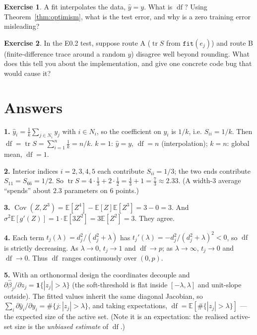 \documentclass[11pt]{article}
\DeclareMathOperator{\tr}{tr}
\DeclareMathOperator{\Cov}{Cov}
\DeclareMathOperator{\df}{df}
\newcommand{\E}{\mathbb{E}}
\newcommand{\yhat}{\hat y}
\theoremstyle{definition}
\newtheorem{exercise}{Exercise}
\theoremstyle{plain}
\begin{document}
\begin{exercise}
A fit interpolates the data, $\yhat=y$. What is $\df$? Using
Theorem~\ref{thm:optimism}, what is the test error, and why is a zero training
error misleading?
\end{exercise}

\begin{exercise}
In the E0.2 test, suppose route A ($\tr S$ from $\texttt{fit}(e_j)$) and route B
(finite-difference trace around a random $y$) disagree well beyond rounding. What
does this tell you about the implementation, and give one concrete code bug that
would cause it?
\end{exercise}

\section*{Answers}

\textbf{1.} $\yhat_i=\frac1k\sum_{j\in N_i}y_j$ with $i\in N_i$, so the coefficient
on $y_i$ is $1/k$, i.e. $S_{ii}=1/k$. Then $\df=\tr S=\sum_{i=1}^n \frac1k=n/k$.
$k=1$: $\yhat=y$, $\df=n$ (interpolation); $k=n$: global mean, $\df=1$.

\textbf{2.} Interior indices $i=2,3,4,5$ each contribute $S_{ii}=1/3$; the two ends
contribute $S_{11}=S_{66}=1/2$. So $\tr S = 4\cdot\frac13 + 2\cdot\frac12
= \frac43 + 1 = \frac73 \approx 2.33$. (A width-$3$ average ``spends'' about $2.3$
parameters on $6$ points.)

\textbf{3.} $\Cov(Z,Z^3)=\E[Z^4]-\E[Z]\E[Z^3]=3-0=3$. And
$\sigma^2\E[g'(Z)]=1\cdot\E[3Z^2]=3\E[Z^2]=3$. They agree.

\textbf{4.} Each term $t_j(\lambda)=d_j^2/(d_j^2+\lambda)$ has
$t_j'(\lambda)=-d_j^2/(d_j^2+\lambda)^2<0$, so $\df$ is strictly decreasing. As
$\lambda\to0$, $t_j\to1$ and $\df\to p$; as $\lambda\to\infty$, $t_j\to0$ and
$\df\to0$. Thus $\df$ ranges continuously over $(0,p)$.

\textbf{5.} With an orthonormal design the coordinates decouple and
$\partial\hat\beta_j/\partial z_j=\mathbf 1\{|z_j|>\lambda\}$ (the soft-threshold is
flat inside $[-\lambda,\lambda]$ and unit-slope outside). The fitted values inherit
the same diagonal Jacobian, so
$\sum_i\partial\yhat_i/\partial y_i=\#\{j:|z_j|>\lambda\}$, and taking expectations,
$\df=\E[\#\{|z_j|>\lambda\}]$ --- the expected size of the active set. (Note it is an
expectation: the realised active-set size is the \emph{unbiased estimate} of $\df$.)
\end{document}
